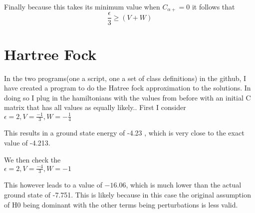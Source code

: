 \documentclass[11pt]{article} %
\begin{document}
Finally because this takes its minimum value when $C_{\alpha+}=0$ it follows that\\

\begin{equation}
\frac{\epsilon}{3}\geq \left(V+W\right)
\end{equation}
\section{Hartree Fock}

In the two programs(one a script, one a set of class definitions) in the github, I have created a program to do the Hatree fock approximation to the solutions. In doing so I plug in the hamiltonians with the values from before with an initial C matrix that has all values as equally likely.. First I consider $\epsilon=2, V=\frac{-1}{3}, W=-\frac{1}{4}$

This results in a ground state energy of -4.23 , which is very close to the exact value of -4.213.

We then check the\\
$\epsilon=2, V=\frac{-4}{3}, W=-1$

This however leads to a value of $-16.06$, which is much lower than the actual ground state of -7.751. This is likely because in this case the original assumption of H0 being dominant with the other terms being perturbations is less valid. \\
\end{document}
